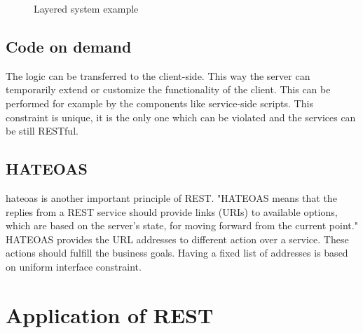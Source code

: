 \begin{figure}[htp] 
\caption{Layered system example}
\label{fig:layered-system}
\end{figure} 

\subsection{Code on demand}

The logic can be transferred to the client-side. This way the server can temporarily extend or customize the functionality of the client. This can be performed for example by the components like service-side scripts.
This constraint is unique, it is the only one which can be violated and the services can be still RESTful.

\subsection{HATEOAS}
\gls{hateoas} is another important principle of REST. "HATEOAS means that the replies from a REST service should provide links (URIs) to available options, which are based on the server's state, for moving forward from the current point." \cite{soa-patterns} HATEOAS provides the URL addresses to different action over a service. These actions should fulfill the business goals. Having a fixed list of addresses is based on uniform interface constraint.

\section{Application of REST}


